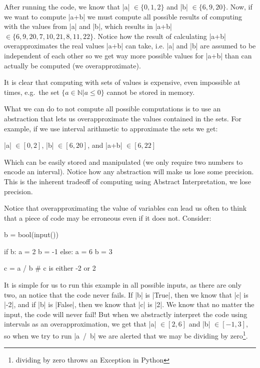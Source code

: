 After running the code, we know that \pycode|a| \(\in \{0, 1, 2\}\) and
\pycode|b| \(\in \{6, 9, 20\}\). Now, if we want to compute \pycode|a+b|
we must compute all possible results of computing with the values from
\pycode|a| and \pycode|b|, which results in \pycode|a+b|
\(\in \{6, 9, 20, 7, 10, 21, 8, 11, 22\}\). Notice how the result of
calculating \pycode|a+b| overapproximates the real values \pycode|a+b|
can take, i.e. \pycode|a| and \pycode|b| are assumed to be independent
of each other so we get way more possible values for \pycode|a+b| than
can actually be computed (we overapproximate).

It is clear that computing with sets of values is expensive, even
impossible at times, e.g.~the set \(\{a \in \mathbb{N} | a \leq 0\}\)
cannot be stored in memory.

What we can do to not compute all possible computations is to use an
abstraction that lets us overapproximate the values contained in the
sets. For example, if we use interval arithmetic to approximate the sets
we get:

\pycode|a| \(\in \left[0, 2\right]\), \pycode|b|
\(\in \left[6, 20\right]\), and \pycode|a+b| \(\in \left[6, 22\right]\)

Which can be easily stored and manipulated (we only require two numbers
to encode an interval). Notice how any abstraction will make us lose
some precision. This is the inherent tradeoff of computing using
Abstract Interpretation, we lose precision.

Notice that overapproximating the value of variables can lead us often
to think that a piece of code may be erroneous even if it does not.
Consider:

\begin{pythoncode}
b = bool(input())

if b:
  a = 2
  b = -1
else:
  a = 6
  b = 3

c = a / b  # c is either -2 or 2
\end{pythoncode}

It is simple for us to run this example in all possible inputs, as there
are only two, an notice that the code never fails. If \pycode|b| is
\pycode|True|, then we know that \pycode|c| is \pycode|-2|, and if
\pycode|b| is \pycode|False|, then we know that \pycode|c| is
\pycode|2|. We know that no matter the input, the code will never fail!
But when we abstractly interpret the code using intervals as an
overapproximation, we get that \pycode|a| \(\in [2,6]\) and \pycode|b|
\(\in [-1,3]\), so when we try to run \pycode|a\ /\ b| we are alerted
that we may be dividing by zero\footnote{dividing by zero throws an
  Exception in Python}.

